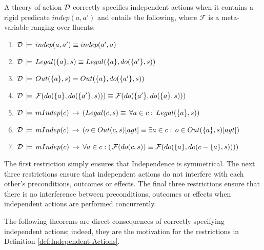 \begin{defnL}
 A theory of action $\mathcal{D}$ correctly
specifies independent actions when it contains a rigid predicate $indep(a,a')$
and entails the following, where $\mathcal{F}$ is a meta-variable
ranging over fluents:\label{def:Independent-Actions}
\end{defnL}
\begin{enumerate}
\item $\mathcal{D}\,\models\, indep(a,a')\equiv indep(a',a)$
\item $\mathcal{D}\,\models\, Legal(\{a\},s)\equiv Legal(\{a\},do(\{a'\},s))$
\item $\mathcal{D}\,\models\, Out(\{a\},s)=Out(\{a\},do(\{a'\},s))$
\item $\mathcal{D}\,\models\,\mathcal{F}(do(\{a\},do(\{a'\},s)))\equiv\mathcal{F}(do(\{a'\},do(\{a\},s)))$
\item $\mathcal{D}\,\models\, mIndep(c)\,\rightarrow\,\left(Legal(c,s)\equiv\,\forall a\in c:\, Legal(\{a\},s)\right)$
\item $\mathcal{D}\,\models\, mIndep(c)\,\rightarrow\,\left(o\in Out(c,s)[agt]\equiv\exists a\in c:\, o\in Out(\{a\},s)[agt]\right)$
\item $\mathcal{D}\,\models\, mIndep(c)\,\rightarrow\,\forall a\in c:\left(\,\mathcal{F}(do(c,s))\equiv\mathcal{F}(do(\{a\},do(c-\{a\},s)))\right)$
\end{enumerate}
The first restriction simply ensures that Independence is symmetrical.
The next three restrictions ensure that independent actions do not
interfere with each other's preconditions, outcomes or effects. The
final three restrictions ensure that there is no interference between
preconditions, outcomes or effects when independent actions are performed
concurrently.

The following theorems are direct consequences of correctly specifying
independent actions; indeed, they are the motivation for the restrictions
in Definition \ref{def:Independent-Actions}.

